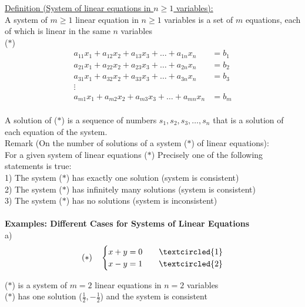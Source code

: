 \documentclass{jhwhw}
\begin{document}
\underline{Definition (System of linear equations in \(n \geq 1\) variables):}
\\

A system of \(m \geq 1\) linear equation in \(n \geq 1\) variables is a set of \(m\) equations, each of which is linear in the same \(n\) variables
\\

(\(\ast\)) \begin{align*} 
a_{11} x_1 + a_{12} x_2 + a_{13} x_3 + \ldots + a_{1n} x_n &= b_1\\
a_{21} x_1 + a_{22} x_2 + a_{23} x_3 + \ldots + a_{2n} x_n &= b_2\\
a_{31} x_1 + a_{32} x_2 + a_{33} x_3 + \ldots + a_{3n} x_n &= b_3\\
\vdots\\
a_{m1} x_1 + a_{m2} x_2 + a_{m3} x_3 + \ldots + a_{mn} x_n &= b_m
\end{align*}
\\

A solution of (\(\ast\)) is a sequence of numbers \(s_1, s_2, s_3, \ldots, s_n\) that is a solution of each equation of the system.
\\

Remark (On the number of solutions of a system (\(\ast\)) of linear equations):
\\

For a given system of linear equations (\(\ast\)) Precisely one of the following statements is true:
\\

1) The system (\(\ast\)) has exactly one solution (system is consistent) \\
2) The system (\(\ast\)) has infinitely many solutions (system is consistent) \\
3) The system (\(\ast\)) has no solutions (system is inconsistent) \\
\\

\textbf{Examples: Different Cases for Systems of Linear Equations}
\\

a) \begin{align*}
    (\ast) \quad \begin{cases}
        x+y=0 & \quad \textcircled{1} \\ x-y=1 & \quad \textcircled{2}
    \end{cases}
\end{align*}

(\(\ast\)) is a system of \(m =2 \) linear equations in \(n=2\) variables \\
(\(\ast\)) has one solution (\(\frac{1}{2}, -\frac{1}{2}\)) and the system is consistent
\\ \\
\end{document}
